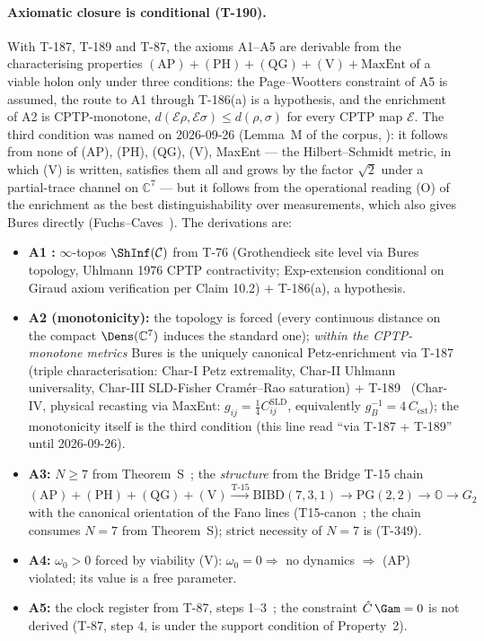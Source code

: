 \paragraph{Axiomatic closure is conditional (T-190).}
With T-187, T-189 and T-87, the axioms A1--A5 are derivable from the characterising
properties $(\text{AP})+(\text{PH})+(\text{QG})+(\text{V})+\text{MaxEnt}$ of a viable holon
only under three conditions: the Page--Wootters constraint of A5 is assumed, the route
to A1 through T-186(a) is a hypothesis, and the enrichment of A2 is CPTP-monotone,
$d(\mathcal E\rho,\mathcal E\sigma) \le d(\rho,\sigma)$ for every CPTP map $\mathcal E$. The
third condition was named on 2026-09-26 (Lemma~M of the corpus, ): it follows from
none of (AP), (PH), (QG), (V), MaxEnt --- the Hilbert--Schmidt metric, in which (V) is
written, satisfies them all and grows by the factor $\sqrt2$ under a partial-trace channel on
$\mathbb{C}^7$ --- but it follows from the operational reading (O) of the enrichment as the
best distinguishability over measurements, which also gives Bures directly
(Fuchs--Caves~\cite{fuchs1995}). The derivations are:
\begin{itemize}[leftmargin=2em,nosep]
  \item \textbf{A1 :} $\infty$-topos $\ShInf(\mathcal{C})$ from T-76 (Grothendieck site
        level  via Bures topology, Uhlmann 1976 CPTP contractivity;
        Exp-extension conditional on Giraud axiom verification per Claim 10.2)
        + T-186(a), a hypothesis.
  \item \textbf{A2  (monotonicity):} the topology is forced (every continuous
        distance on the compact $\Dens(\mathbb{C}^7)$ induces the standard one); \emph{within
        the CPTP-monotone metrics} Bures is the uniquely canonical Petz-enrichment via T-187~ (triple
        characterisation: Char-I Petz extremality, Char-II Uhlmann universality, Char-III
        SLD-Fisher Cram\'er--Rao saturation) + T-189~ (Char-IV, physical recasting via
        MaxEnt: $g_{ij} = \tfrac14 C^{\mathrm{SLD}}_{ij}$, equivalently $g_B^{-1} = 4\,C_{\mathrm{est}}$);
        the monotonicity itself is the third condition (this line read ``via T-187 + T-189''
        until 2026-09-26).
  \item \textbf{A3:} $N \geq 7$ from Theorem~S~; the \emph{structure} from the
        Bridge T-15 chain
        $(\text{AP})+(\text{PH})+(\text{QG})+(\text{V}) \xrightarrow{\text{T-15}} \mathrm{BIBD}(7,3,1) \to \mathrm{PG}(2,2) \to \mathbb O \to G_2$
        with the canonical orientation of the Fano lines (T15-canon~; the chain
        consumes $N = 7$ from Theorem~S); strict necessity of $N = 7$ is
         (T-349).
  \item \textbf{A4:} $\omega_0 > 0$ forced by viability (V): $\omega_0 = 0 \Rightarrow$ no
        dynamics $\Rightarrow$ (AP) violated; its value is a free parameter.
  \item \textbf{A5:} the clock register from T-87, steps 1--3~; the constraint
        $\hat C\,\Gam = 0$ is not derived (T-87, step 4, is  under the support
        condition of Property~2).
\end{itemize}

